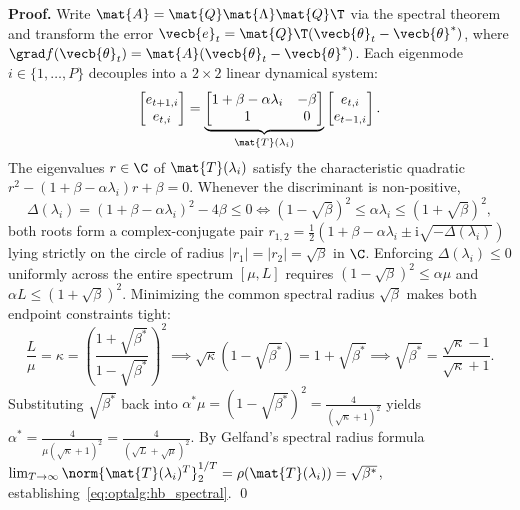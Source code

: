 \documentclass[../../../../master.tex]{subfiles}
\begin{document}
\begin{coremath}
\textbf{Proof.} Write $\mat{A} = \mat{Q}\mat{\Lambda}\mat{Q}\T$ via the spectral theorem and transform the error $\vecb{e}_t = \mat{Q}\T(\vecb{\theta}_t - \vecb{\theta}^*)$, where $\grad f(\vecb{\theta}_t) = \mat{A}(\vecb{\theta}_t - \vecb{\theta}^*)$. Each eigenmode $i \in \{1,\dots,P\}$ decouples into a $2\times 2$ linear dynamical system:
\[
  \begin{bmatrix} e_{t+1,i} \\ e_{t,i} \end{bmatrix}
  = \underbrace{\begin{bmatrix} 1 + \beta - \alpha \lambda_i & -\beta \\ 1 & 0 \end{bmatrix}}_{\mat{T}(\lambda_i)}
  \begin{bmatrix} e_{t,i} \\ e_{t-1,i} \end{bmatrix}.
\]
The eigenvalues $r \in \C$ of $\mat{T}(\lambda_i)$ satisfy the characteristic quadratic $r^2 - (1 + \beta - \alpha\lambda_i)r + \beta = 0$. Whenever the discriminant is non-positive,
\[
  \Delta(\lambda_i) = (1 + \beta - \alpha\lambda_i)^2 - 4\beta \le 0 \iff (1 - \sqrt{\beta})^2 \le \alpha \lambda_i \le (1 + \sqrt{\beta})^2,
\]
both roots form a complex-conjugate pair $r_{1,2} = \frac{1}{2}(1 + \beta - \alpha\lambda_i \pm \mathrm{i}\sqrt{-\Delta(\lambda_i)})$ lying strictly on the circle of radius $|r_1| = |r_2| = \sqrt{\beta}$ in $\C$. Enforcing $\Delta(\lambda_i) \le 0$ uniformly across the entire spectrum $[\mu, L]$ requires $(1-\sqrt{\beta})^2 \le \alpha \mu$ and $\alpha L \le (1+\sqrt{\beta})^2$. Minimizing the common spectral radius $\sqrt{\beta}$ makes both endpoint constraints tight:
\[
  \frac{L}{\mu} = \kappa = \left(\frac{1 + \sqrt{\beta^*}}{1 - \sqrt{\beta^*}}\right)^2 \implies \sqrt{\kappa}(1 - \sqrt{\beta^*}) = 1 + \sqrt{\beta^*} \implies \sqrt{\beta^*} = \frac{\sqrt{\kappa} - 1}{\sqrt{\kappa} + 1}.
\]
Substituting $\sqrt{\beta^*}$ back into $\alpha^* \mu = (1 - \sqrt{\beta^*})^2 = \frac{4}{(\sqrt{\kappa}+1)^2}$ yields $\alpha^* = \frac{4}{\mu(\sqrt{\kappa}+1)^2} = \frac{4}{(\sqrt{L}+\sqrt{\mu})^2}$. By Gelfand's spectral radius formula $\lim_{T\to\infty}\norm{\mat{T}(\lambda_i)^T}_2^{1/T} = \rho(\mat{T}(\lambda_i)) = \sqrt{\beta^*}$, establishing~\eqref{eq:optalg:hb_spectral}. \qed
\end{coremath}
\end{document}
